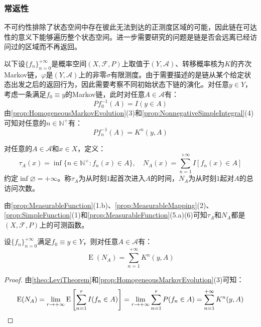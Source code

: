 \subsubsection{常返性}
不可约性排除了状态空间中存在彼此无法到达的正测度区域的可能，因此链在可达性的意义下能够遍历整个状态空间。进一步需要研究的问题是链是否会远离已经访问过的区域而不再返回。	\par
以下设$\{f_n\}_{n=0}^{+\infty}$是概率空间$(X,\mathscr{F},P)$上取值于$(Y,\mathscr{A})$、转移概率核为$K$的齐次Markov链，$\varphi$是$(Y,\mathscr{A})$上的非零$\sigma$有限测度。由于需要描述的是链从某个给定状态出发之后的返回行为，因此需要考察不同初始状态下链的演化。对任意$y\in Y$，考虑一条满足$f_0\equiv y$的Markov链，此时对任意$A\in\mathscr{A}$有：
\begin{equation*}
	Pf_0^{-1}(A)=I(y\in A)
\end{equation*}
由\cref{prop:HomogeneousMarkovEvolution}(3)和\cref{prop:NonnegativeSimpleIntegral}(4)可知对任意的$n\in\mathbb{N}^+$有：
\begin{equation*}
	Pf_n^{-1}(A)=K^n(y,A)
\end{equation*}
\begin{definition}
	对任意的$A\in\mathscr{A}$和$x\in X$，定义：
	\begin{equation*}
		\tau_A(x)=\inf\{n\in\mathbb{N}^+:f_n(x)\in A\},\quad N_A(x)=\sum_{n=1}^{+\infty}I[f_n(x)\in A]
	\end{equation*}
	约定$\inf\varnothing=+\infty$。称$\tau_A$为从时刻$1$起首次进入$A$的时间，$N_A$为从时刻$1$起对$A$的总访问次数。
\end{definition}
由\cref{prop:MeasurableFunction}(1.b)、\cref{prop:MeasurableMapping}(2)、\cref{prop:SimpleFunction}(1)和\cref{prop:MeasurableFunction}(5.a)(6)可知$\tau_A$和$N_A$都是$(X,\mathscr{F},P)$上的可测函数。
\begin{property}\label{prop:MarkovOccupationExpectation}
	设$\{f_n\}_{n=0}^{+\infty}$满足$f_0\equiv y\in Y$，则对任意$A\in\mathscr{A}$有：
	\begin{equation*}
		\operatorname{E}(N_A)=\sum_{n=1}^{+\infty}K^n(y,A)
	\end{equation*}
\end{property}
\begin{proof}
	由\cref{theo:LeviTheorem}和\cref{prop:HomogeneousMarkovEvolution}(3)可知：
	\begin{equation*}
		\operatorname{E}(N_A)=\lim_{r\to+\infty}\operatorname{E}\left[\sum_{n=1}^rI(f_n\in A)\right]=\lim_{r\to+\infty}\sum_{n=1}^rP(f_n\in A)=\sum_{n=1}^{+\infty}K^n(y,A)\qedhere
	\end{equation*}
\end{proof}
